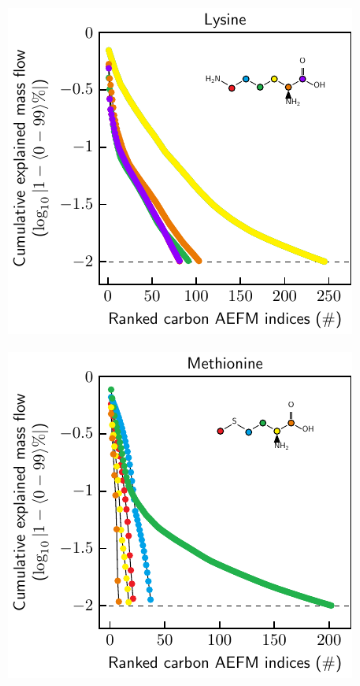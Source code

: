 \documentclass[]{article}
\begin{document}
\begin{figure}
    \begin{subfigure}[t]{0.247\textwidth}
        \caption{}
        \includegraphics[width=\textwidth]{subpanels/cumulative-source-met-22-log.pdf}\\
    \end{subfigure}
    \begin{subfigure}[t]{0.247\textwidth}
        \caption{}
        \includegraphics[width=\textwidth]{subpanels/cumulative-source-met-23-log.pdf}\\

\end{subfigure}
\end{figure}
\end{document}
